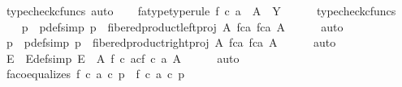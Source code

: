 \begin{isabellebody}
\ {\isacharparenleft}{\kern0pt}typecheck{\isacharunderscore}{\kern0pt}cfuncs{\isacharcomma}{\kern0pt}\ auto{\isacharparenright}{\kern0pt}\isanewline
\isanewline
\ \ \isamarkupfalse%
\ fa{\isacharunderscore}{\kern0pt}type{\isacharbrackleft}{\kern0pt}type{\isacharunderscore}{\kern0pt}rule{\isacharbrackright}{\kern0pt}{\isacharcolon}{\kern0pt}\ {\isachardoublequoteopen}f\ {\isasymcirc}\isactrlsub c\ a\ {\isacharcolon}{\kern0pt}\ A\ {\isasymrightarrow}\ Y{\isachardoublequoteclose}\isanewline
\ \ \ \ \isamarkupfalse%
\ {\isacharparenleft}{\kern0pt}typecheck{\isacharunderscore}{\kern0pt}cfuncs{\isacharparenright}{\kern0pt}\isanewline
\isanewline
\ \ \isamarkupfalse%
\ p{}\ \ p{}{\isacharunderscore}{\kern0pt}def{\isacharbrackleft}{\kern0pt}simp{\isacharbrackright}{\kern0pt}{\isacharcolon}{\kern0pt}\ {\isachardoublequoteopen}p{}\ {\isacharequal}{\kern0pt}\ fibered{\isacharunderscore}{\kern0pt}product{\isacharunderscore}{\kern0pt}left{\isacharunderscore}{\kern0pt}proj\ A\ {\isacharparenleft}{\kern0pt}f{\isasymcirc}\isactrlsub ca{\isacharparenright}{\kern0pt}\ {\isacharparenleft}{\kern0pt}f{\isasymcirc}\isactrlsub ca{\isacharparenright}{\kern0pt}\ A{\isachardoublequoteclose}\isanewline
\ \ \ \ \isamarkupfalse%
\ auto\isanewline
\ \ \isamarkupfalse%
\ p{}\ \ p{}{\isacharunderscore}{\kern0pt}def{\isacharbrackleft}{\kern0pt}simp{\isacharbrackright}{\kern0pt}{\isacharcolon}{\kern0pt}\ {\isachardoublequoteopen}p{}\ {\isacharequal}{\kern0pt}\ fibered{\isacharunderscore}{\kern0pt}product{\isacharunderscore}{\kern0pt}right{\isacharunderscore}{\kern0pt}proj\ A\ {\isacharparenleft}{\kern0pt}f{\isasymcirc}\isactrlsub ca{\isacharparenright}{\kern0pt}\ {\isacharparenleft}{\kern0pt}f{\isasymcirc}\isactrlsub ca{\isacharparenright}{\kern0pt}\ A{\isachardoublequoteclose}\isanewline
\ \ \ \ \isamarkupfalse%
\ auto\isanewline
\ \ \isamarkupfalse%
\ E\ \ E{\isacharunderscore}{\kern0pt}def{\isacharbrackleft}{\kern0pt}simp{\isacharbrackright}{\kern0pt}{\isacharcolon}{\kern0pt}\ {\isachardoublequoteopen}E\ {\isacharequal}{\kern0pt}\ A\ \isactrlbsub f\ {\isasymcirc}\isactrlsub c\ a\isactrlesub {\isasymtimes}\isactrlsub c\isactrlbsub f\ {\isasymcirc}\isactrlsub c\ a\isactrlesub \ A{\isachardoublequoteclose}\isanewline
\ \ \ \ \isamarkupfalse%
\ auto\isanewline
\isanewline
\ \ \isamarkupfalse%
\ fa{\isacharunderscore}{\kern0pt}coequalizes{\isacharcolon}{\kern0pt}\ {\isachardoublequoteopen}{\isacharparenleft}{\kern0pt}f\ {\isasymcirc}\isactrlsub c\ a{\isacharparenright}{\kern0pt}\ {\isasymcirc}\isactrlsub c\ p{}\ {\isacharequal}{\kern0pt}\ {\isacharparenleft}{\kern0pt}f\ {\isasymcirc}\isactrlsub c\ a{\isacharparenright}{\kern0pt}\ {\isasymcirc}\isactrlsub c\ p{}{\isachardoublequoteclose}\isanewline

\end{isabellebody}

